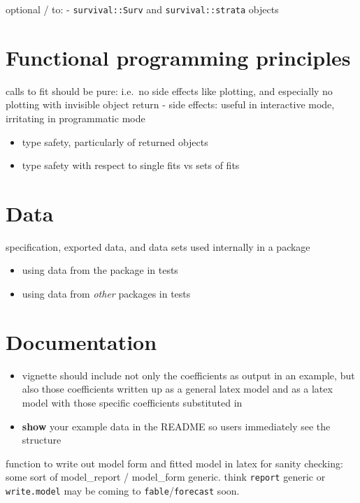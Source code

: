 \documentclass[]{book}
\providecommand{\tightlist}{%
  \setlength{\itemsep}{0pt}\setlength{\parskip}{0pt}}
\theoremstyle{definition}
\theoremstyle{definition}
\theoremstyle{definition}
\theoremstyle{remark}
\begin{document}
optional / to: - \texttt{survival::Surv} and \texttt{survival::strata}
objects

\chapter{Functional programming
principles}\label{functional-programming-principles}

calls to fit should be pure: i.e.~no side effects like plotting, and
especially no plotting with invisible object return - side effects:
useful in interactive mode, irritating in programmatic mode

\begin{itemize}
\tightlist
\item
  type safety, particularly of returned objects
\item
  type safety with respect to single fits vs sets of fits
\end{itemize}

\chapter{Data}\label{data}

specification, exported data, and data sets used internally in a package

\begin{itemize}
\tightlist
\item
  using data from the package in tests
\item
  using data from \emph{other} packages in tests
\end{itemize}

\chapter{Documentation}\label{documentation}

\begin{itemize}
\item
  vignette should include not only the coefficients as output in an
  example, but also those coefficients written up as a general latex
  model and as a latex model with those specific coefficients
  substituted in
\item
  \textbf{show} your example data in the README so users immediately see
  the structure
\end{itemize}

function to write out model form and fitted model in latex for sanity
checking: some sort of model\_report / model\_form generic. think
\texttt{report} generic or \texttt{write.model} may be coming to
\texttt{fable}/\texttt{forecast} soon.
\end{document}
